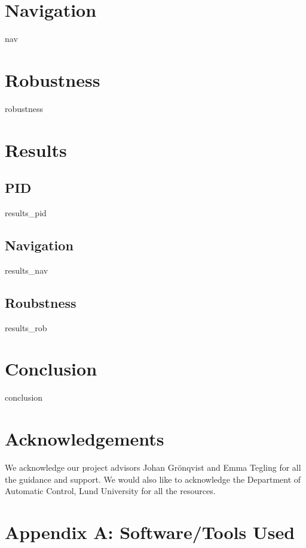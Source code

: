 \documentclass{LTHtwocol} %
\begin{document}
\section{Navigation}
{nav}	

\section{Robustness}
{robustness}

\section{Results}
\subsection{PID}
{results_pid}

\subsection{Navigation}
{results_nav}

\subsection{Roubstness}
{results_rob}

\section{Conclusion}
{conclusion}

\section{Acknowledgements}

We acknowledge our project advisors Johan Grönqvist and Emma Tegling for all the guidance and support. We would also like to acknowledge the Department of Automatic Control, Lund University for all the resources.

\newpage
\printbibliography

\onecolumn
\newpage

\section*{Appendix A: Software/Tools Used}
\end{document}
